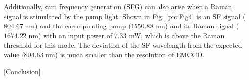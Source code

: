 \documentclass[a4paper,8pt,hyperref, twocolumn]{article}
\begin{document}
Additionally, sum frequency generation (SFG) can also arise when a Raman signal is stimulated by the pump light. 
Shown in Fig. \ref{pic:Fig4} is an SF signal ($804.67$ nm) and the corresponding pump ($1550.88$ nm) and its Raman signal ($1674.22$ nm) with an input power of $7.33$ mW, which is above the Raman threshold for this mode. 
The deviation of the SF wavelength from the expected value ($804.63$ nm) is much smaller than the resolution of EMCCD.

[Conclusion]





\end{document}
